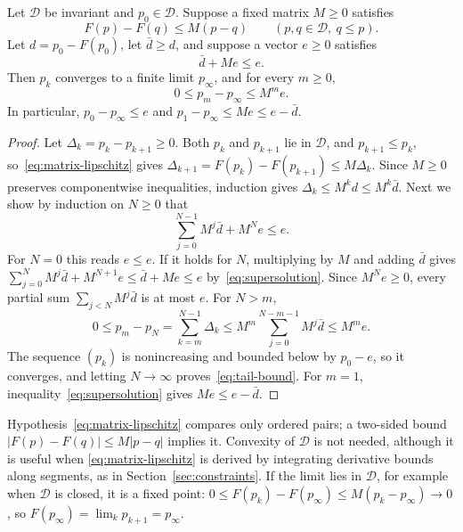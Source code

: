 \begin{theorem}\label{thm:residual}
Let $\mathcal D$ be invariant and $p_0\in\mathcal D$. Suppose a fixed
matrix $M\ge0$ satisfies
\begin{equation}\label{eq:matrix-lipschitz}
 F(p)-F(q)\le M(p-q)\qquad(p,q\in\mathcal D,\ q\le p).
\end{equation}
Let $d=p_0-F(p_0)$, let $\bar d\ge d$, and suppose a vector $e\ge0$
satisfies
\begin{equation}\label{eq:supersolution}
 \bar d+Me\le e.
\end{equation}
Then $p_k$ converges to a finite limit $p_\infty$, and for every
$m\ge0$,
\begin{equation}\label{eq:tail-bound}
 0\le p_m-p_\infty\le M^me.
\end{equation}
In particular, $p_0-p_\infty\le e$ and
$p_1-p_\infty\le Me\le e-\bar d$.
\end{theorem}
\begin{proof}
Let $\Delta_k=p_k-p_{k+1}\ge0$. Both $p_k$ and $p_{k+1}$ lie in
$\mathcal D$, and $p_{k+1}\le p_k$, so~\eqref{eq:matrix-lipschitz} gives
$\Delta_{k+1}=F(p_k)-F(p_{k+1})\le M\Delta_k$. Since $M\ge0$ preserves
componentwise inequalities, induction gives
$\Delta_k\le M^kd\le M^k\bar d$. Next we show by induction on $N\ge0$ that
\[
 \sum_{j=0}^{N-1}M^j\bar d+M^Ne\le e.
\]
For $N=0$ this reads $e\le e$. If it holds for $N$, multiplying by $M$
and adding $\bar d$ gives
$\sum_{j=0}^{N}M^j\bar d+M^{N+1}e\le\bar d+Me\le e$
by~\eqref{eq:supersolution}. Since $M^Ne\ge0$, every partial sum
$\sum_{j<N}M^j\bar d$ is at most $e$. For $N>m$,
\[
 0\le p_m-p_N=\sum_{k=m}^{N-1}\Delta_k
 \le M^m\sum_{j=0}^{N-m-1}M^j\bar d\le M^me.
\]
The sequence $(p_k)$ is nonincreasing and bounded below by $p_0-e$, so it
converges, and letting $N\to\infty$ proves~\eqref{eq:tail-bound}. For
$m=1$, inequality~\eqref{eq:supersolution} gives $Me\le e-\bar d$.
\end{proof}

Hypothesis~\eqref{eq:matrix-lipschitz} compares only ordered pairs; a
two-sided bound $|F(p)-F(q)|\le M|p-q|$ implies it. Convexity of
$\mathcal D$ is not needed, although it is useful when
\eqref{eq:matrix-lipschitz} is derived by integrating derivative bounds
along segments, as in Section~\ref{sec:constraints}. If the limit lies in
$\mathcal D$, for example when $\mathcal D$ is closed, it is a fixed
point: $0\le F(p_k)-F(p_\infty)\le M(p_k-p_\infty)\to0$, so
$F(p_\infty)=\lim_kp_{k+1}=p_\infty$.

